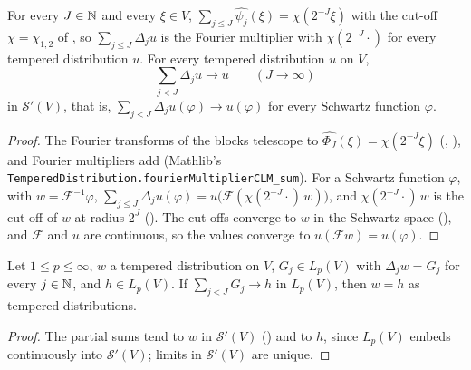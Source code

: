 \begin{theorem}
\label{thm:distrib-block-decomposition}
\leanok
{}
For every $J \in \mathbb{N}$ and every $\xi \in V$, $\sum_{j \leq J} \widehat{\psi_j}(\xi) =
\chi(2^{-J} \xi)$ with the cut-off $\chi = \chi_{1,2}$ of , so
$\sum_{j \leq J} \Delta_j u$ is the Fourier multiplier with $\chi(2^{-J} \cdot)$ for every
tempered distribution $u$. For every tempered distribution $u$ on $V$,
\[
  \sum_{j < J} \Delta_j u \to u \qquad (J \to \infty)
\]
in $\mathcal S'(V)$, that is, $\sum_{j < J} \Delta_j u(\varphi) \to u(\varphi)$ for every
Schwartz function $\varphi$.
\end{theorem}

\begin{proof}
\leanok
The Fourier transforms of the blocks telescope to $\widehat{\Phi_J}(\xi) = \chi(2^{-J} \xi)$
(, ), and Fourier multipliers add
(Mathlib's \texttt{TemperedDistribution.\allowbreak fourierMultiplierCLM\_\allowbreak sum}). For a
Schwartz function $\varphi$, with $w = \mathcal F^{-1} \varphi$,
$\sum_{j \leq J} \Delta_j u(\varphi) = u\bigl(\mathcal F(\chi(2^{-J} \cdot) \, w)\bigr)$, and
$\chi(2^{-J} \cdot) \, w$ is the cut-off of $w$ at radius $2^J$ (). The
cut-offs converge to $w$ in the Schwartz space (), and
$\mathcal F$ and $u$ are continuous, so the values converge to $u(\mathcal F w) = u(\varphi)$.
\end{proof}

\begin{lemma}
\label{lem:distrib-block-limit}
\leanok
{}
Let $1 \leq p \leq \infty$, $w$ a tempered distribution on $V$, $G_j \in L_p(V)$ with
$\Delta_j w = G_j$ for every $j \in \mathbb{N}$, and $h \in L_p(V)$. If $\sum_{j < J} G_j \to h$ in
$L_p(V)$, then $w = h$ as tempered distributions.
\end{lemma}

\begin{proof}
\leanok
The partial sums tend to $w$ in $\mathcal S'(V)$ () and to
$h$, since $L_p(V)$ embeds continuously into $\mathcal S'(V)$; limits in $\mathcal S'(V)$ are
unique.
\end{proof}

